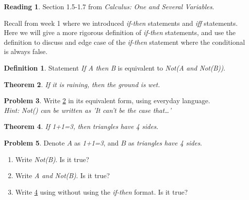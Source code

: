 \documentclass[letterpaper, 12pt]{article}
\theoremstyle{plain}
\newtheorem{theorem}{Theorem}[section]
\theoremstyle{definition}
\newtheorem{definition}[theorem]{Definition}
\newtheorem{problem}[theorem]{Problem}
\newtheorem*{reading}{Reading}
\begin{document}
\begin{reading}
    Section 1.5-1.7 from \textit{Calculus: One and Several Variables}.
\end{reading}

Recall from week 1 where we introduced \textit{if-then} statements and \textit{iff} statements. Here we will give a more rigorous definition of \textit{if-then} statements, and use the definition to discuss and edge case of the \textit{if-then} statement where the conditional is always false.

\begin{definition}
    Statement \textit{If A then B} is equivalent to \textit{Not(A and Not(B))}.
\end{definition}

\begin{theorem}\label{Dummy}
    If it is raining, then the ground is wet.
\end{theorem}

\begin{problem}
    Write \ref{Dummy} in its equivalent form, using everyday language.\\
    \textit{Hint: Not() can be written as 'It can't be the case that\dots'}
\end{problem}

\begin{theorem}\label{True}
    If 1+1=3, then triangles have 4 sides.
\end{theorem}

\begin{problem}
    Denote $A$ as \textit{1+1=3}, and $B$ as \textit{triangles have 4 sides}.
    \begin{enumerate}
        \item Write \textit{Not(B)}. Is it true?
        \item Write \textit{A and Not(B)}. Is it true?
        \item Write \ref{True} using without using the \textit{if-then} format. Is it true?
    \end{enumerate}
\end{problem}
\end{document}
